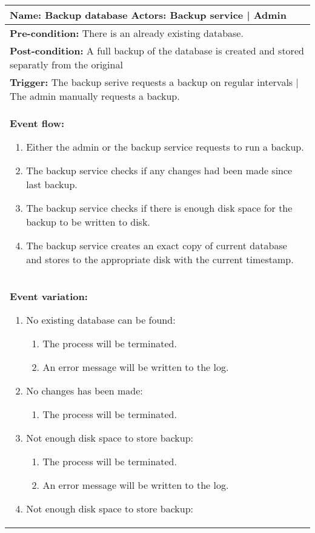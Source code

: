 \begin{tabular}{|p{16.5cm}|}
\hline
\textbf{Name:} Backup database \vline   \textbf{ Actors:} Backup service | Admin\\ \hline
\textbf{Pre-condition:} There is an already existing database.\\ \hline
\textbf{Post-condition:} A full backup of the database is created and stored separatly from the original \\ \hline
\textbf{Trigger: } The backup serive requests a backup on regular intervals | The admin manually requests a backup. \\ \hline
\textbf{Event flow: }
\begin{enumerate}
	\item Either the admin or the backup service requests to run a backup.
	\item The backup service checks if any changes had been made since last backup.
	\item The backup service checks if there is enough disk space for the backup to be written to disk.
	\item The backup service creates an exact copy of current database and stores to the appropriate disk with the current timestamp.
\end{enumerate}
\\ \hline
\textbf{Event variation: }
\begin{enumerate}
	\item No existing database can be found:
	\begin{enumerate}
 		\item The process will be terminated.
		\item An error message will be written to the log.
	\end{enumerate}
	\item No changes has been made:
	\begin{enumerate}
 		\item The process will be terminated.
	\end{enumerate}
	\item Not enough disk space to store backup:
	\begin{enumerate}
 		\item The process will be terminated.
		\item An error message will be written to the log.
	\end{enumerate}
	\item Not enough disk space to store backup:
	\begin{enumerate}

\end{enumerate}
\end{enumerate}
\end{tabular}
